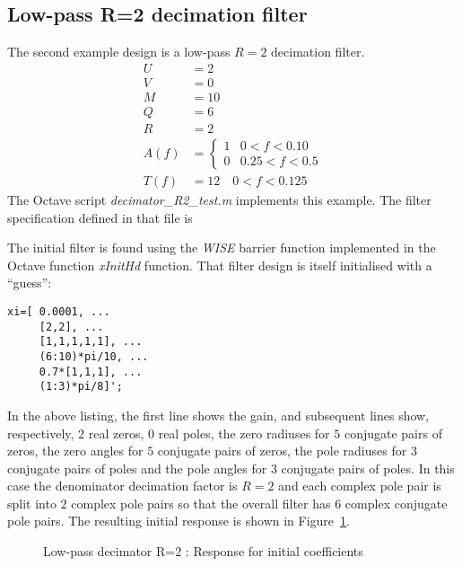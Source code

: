 \documentclass[a4paper,twoside,10pt,english]{report}
\begin{document}
\subsection{\label{sec:Low-pass-R-2-decimation-filter}Low-pass R=2 decimation filter}
The second example design is a low-pass $R=2$ decimation filter.
\begin{align*}
U &= 2\\
V &= 0\\
M &= 10\\
Q &= 6\\
R &= 2\\
A\left(f\right) &= \begin{cases}
1 & 0<f<0.10\\
0 & 0.25<f<0.5
\end{cases}\\
T\left(f\right) &= 12\quad0<f<0.125
\end{align*}
The Octave script \emph{decimator\_R2\_test.m} implements this example.  The
filter specification defined in that file is
\begin{small}

\end{small}
The initial filter is found using the \emph{WISE} barrier function implemented in
the Octave function \emph{xInitHd} function. That filter design is itself
initialised with a ``guess'':
\begin{small}
\begin{verbatim}
xi=[ 0.0001, ...
     [2,2], ...
     [1,1,1,1,1], ...
     (6:10)*pi/10, ...
     0.7*[1,1,1], ...
     (1:3)*pi/8]';
\end{verbatim}
\end{small}
In the above listing, the first line shows the gain, and subsequent lines show,
respectively, $2$ real zeros, $0$ real poles, the zero radiuses for $5$
conjugate pairs of zeros, the zero angles for $5$ conjugate pairs of zeros, the
pole radiuses for $3$ conjugate pairs of poles and the pole angles for $3$
conjugate pairs of poles. In this case the denominator decimation
factor is $R=2$ and each complex pole pair is split into $2$ complex pole pairs
so that the overall filter has $6$ complex conjugate pole pairs.
The resulting initial response is shown in 
Figure~\ref{fig:Decimator-R-2-Initial-x0}. 
\begin{figure}[!htbp]
\begin{center}
\scalebox{0.7}{}
\caption{Low-pass decimator R=2 : Response for initial coefficients}
\label{fig:Decimator-R-2-Initial-x0}
\end{center}
\end{figure}
\end{document}
